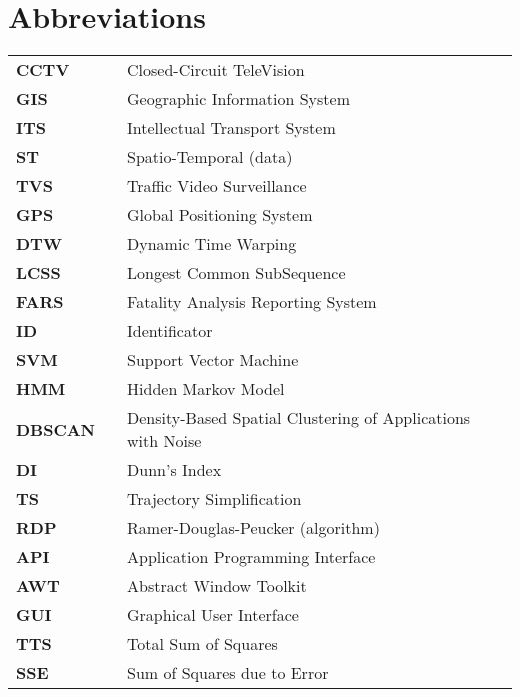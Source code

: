 \section*{Abbreviations}
\label{ch:Abbreviations}

\begin{tabular}{lll}
	\\
	\textbf{CCTV}       & & {Closed-Circuit TeleVision} \\[0.5ex]	
	\textbf{GIS}        & & {Geographic Information System} \\[0.5ex]
	\textbf{ITS}        & & {Intellectual Transport System} \\[0.5ex]
	\textbf{ST}         & & {Spatio-Temporal (data)} \\[0.5ex]
	\textbf{TVS}        & & {Traffic Video Surveillance} \\[0.5ex]
	\textbf{GPS}        & & {Global Positioning System} \\[0.5ex]
	\textbf{DTW}        & & {Dynamic Time Warping} \\[0.5ex]
	\textbf{LCSS}       & & {Longest Common SubSequence} \\[0.5ex]
	\textbf{FARS}       & & {Fatality Analysis Reporting System} \\[0.5ex]
	\textbf{ID}			& & {Identificator} \\[0.5ex]
	\textbf{SVM}		& & {Support Vector Machine} \\[0.5ex]
	\textbf{HMM}		& & {Hidden Markov Model} \\[0.5ex]
	\textbf{DBSCAN}		& & {Density-Based Spatial Clustering of Applications with Noise} \\[0.5ex]
	\textbf{DI}			& & {Dunn's Index} \\[0.5ex]
	\textbf{TS}			& & {Trajectory Simplification} \\[0.5ex]
	\textbf{RDP}		& & {Ramer-Douglas-Peucker (algorithm)} \\[0.5ex]
	\textbf{API}		& & {Application Programming Interface} \\[0.5ex]	
	\textbf{AWT}		& & {Abstract Window Toolkit} \\[0.5ex]
	\textbf{GUI}		& & {Graphical User Interface} \\[0.5ex]
	\textbf{TTS}		& & {Total Sum of Squares} \\[0.5ex]
	\textbf{SSE}		& & {Sum of Squares due to Error} \\[0.5ex]

\end{tabular}
